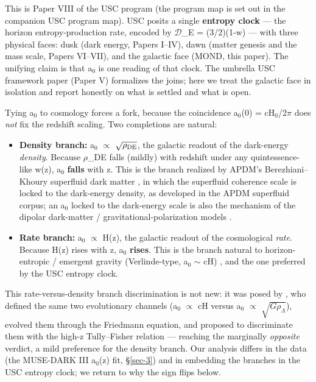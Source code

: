 \documentclass[aps,prd,preprint,nofootinbib,superscriptaddress]{revtex4-2}
\providecommand{\tightlist}{\setlength{\itemsep}{0pt}\setlength{\parskip}{0pt}}
\begin{document}
This is Paper VIII of the USC program (the program map is set out in the
companion USC program map). USC posits a single \textbf{entropy clock}
--- the horizon entropy-production rate, encoded by \(\mathcal{D}\)\_E =
(3/2)(1-w) --- with three physical faces: dusk (dark energy, Papers
I--IV), dawn (matter genesis and the mass scale, Papers VI--VII), and
the galactic face (MOND, this paper). The unifying claim is that
a\(_{0}\) is one reading of that clock. The umbrella USC framework paper
(Paper V) formalizes the joins; here we treat the galactic face in
isolation and report honestly on what is settled and what is open.

Tying a\(_{0}\) to cosmology forces a fork, because the coincidence
a\(_{0}\)(0) = cH\(_{0}\)/2\(\pi\) does \emph{not} fix the redshift
scaling. Two completions are natural:

\begin{itemize}
\tightlist
\item
  \textbf{Density branch:} a\(_{0}\) \(\propto\)
  \(\sqrt{\rho_{\rm DE}}\), the galactic readout of the dark-energy
  \emph{density}. Because \(\rho\)\_DE falls (mildly) with redshift
  under any quintessence-like w(z), a\(_{0}\) \textbf{falls} with z.
  This is the branch realized by APDM's Berezhiani--Khoury superfluid
  dark matter \citep{Berezhiani:2015bqa, Berezhiani:2015pia}, in which
  the superfluid coherence scale is locked to the dark-energy density,
  as developed in the APDM superfluid corpus; an a\(_{0}\) locked to the
  dark-energy scale is also the mechanism of the dipolar dark-matter /
  gravitational-polarization models
  \citep{Blanchet:2008fj, Blanchet:2009zu}.
\item
  \textbf{Rate branch:} a\(_{0}\) \(\propto\) H(z), the galactic readout
  of the cosmological \emph{rate}. Because H(z) rises with z, a\(_{0}\)
  \textbf{rises}. This is the branch natural to horizon-entropic /
  emergent gravity (Verlinde-type, a\(_{0}\) \(\sim\) cH)
  \citep{Verlinde:2016toy}, and the one preferred by the USC entropy
  clock.
\end{itemize}

This rate-versus-density branch discrimination is not new: it was posed
by \citep{Limbach:2008aa}, who defined the same two evolutionary
channels (a\(_{0}\) \(\propto\) cH versus a\(_{0}\) \(\propto\)
\(\sqrt{G\rho_\Lambda}\)), evolved them through the Friedmann equation,
and proposed to discriminate them with the high-z Tully--Fisher relation
--- reaching the marginally \emph{opposite} verdict, a mild preference
for the density branch. Our analysis differs in the data (the MUSE-DARK
III a\(_{0}\)(z) fit, §\ref{sec-3}) and in embedding the branches in the
USC entropy clock; we return to why the sign flips below.
\end{document}

